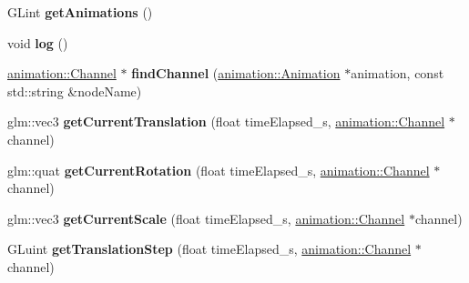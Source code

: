 \begin{DoxyCompactItemize}
\item 
\hypertarget{classfillwave_1_1manager_1_1BoneManager_a47ccfb449d9674c3120ea4d2f0ba62c3}{}G\+Lint {\bfseries get\+Animations} ()\label{classfillwave_1_1manager_1_1BoneManager_a47ccfb449d9674c3120ea4d2f0ba62c3}

\item 
\hypertarget{classfillwave_1_1manager_1_1BoneManager_a911019fc466242c6bf5185910497a47d}{}void {\bfseries log} ()\label{classfillwave_1_1manager_1_1BoneManager_a911019fc466242c6bf5185910497a47d}

\item 
\hypertarget{classfillwave_1_1manager_1_1BoneManager_a83befeb9bce1d44f127cced68a16a45d}{}\hyperlink{classfillwave_1_1animation_1_1Channel}{animation\+::\+Channel} $\ast$ {\bfseries find\+Channel} (\hyperlink{classfillwave_1_1animation_1_1Animation}{animation\+::\+Animation} $\ast$animation, const std\+::string \&node\+Name)\label{classfillwave_1_1manager_1_1BoneManager_a83befeb9bce1d44f127cced68a16a45d}

\item 
\hypertarget{classfillwave_1_1manager_1_1BoneManager_af4c63e5f585324f3804fea03e1adf194}{}glm\+::vec3 {\bfseries get\+Current\+Translation} (float time\+Elapsed\+\_\+s, \hyperlink{classfillwave_1_1animation_1_1Channel}{animation\+::\+Channel} $\ast$channel)\label{classfillwave_1_1manager_1_1BoneManager_af4c63e5f585324f3804fea03e1adf194}

\item 
\hypertarget{classfillwave_1_1manager_1_1BoneManager_ad38cd9c6232b4b1f2ad4c5e59aa9acce}{}glm\+::quat {\bfseries get\+Current\+Rotation} (float time\+Elapsed\+\_\+s, \hyperlink{classfillwave_1_1animation_1_1Channel}{animation\+::\+Channel} $\ast$channel)\label{classfillwave_1_1manager_1_1BoneManager_ad38cd9c6232b4b1f2ad4c5e59aa9acce}

\item 
\hypertarget{classfillwave_1_1manager_1_1BoneManager_a907e6274ff0053ef23a982de3a6c4908}{}glm\+::vec3 {\bfseries get\+Current\+Scale} (float time\+Elapsed\+\_\+s, \hyperlink{classfillwave_1_1animation_1_1Channel}{animation\+::\+Channel} $\ast$channel)\label{classfillwave_1_1manager_1_1BoneManager_a907e6274ff0053ef23a982de3a6c4908}

\item 
\hypertarget{classfillwave_1_1manager_1_1BoneManager_a361968dddf129b4863ce085a9626e69b}{}G\+Luint {\bfseries get\+Translation\+Step} (float time\+Elapsed\+\_\+s, \hyperlink{classfillwave_1_1animation_1_1Channel}{animation\+::\+Channel} $\ast$channel)\label{classfillwave_1_1manager_1_1BoneManager_a361968dddf129b4863ce085a9626e69b}


\end{DoxyCompactItemize}
